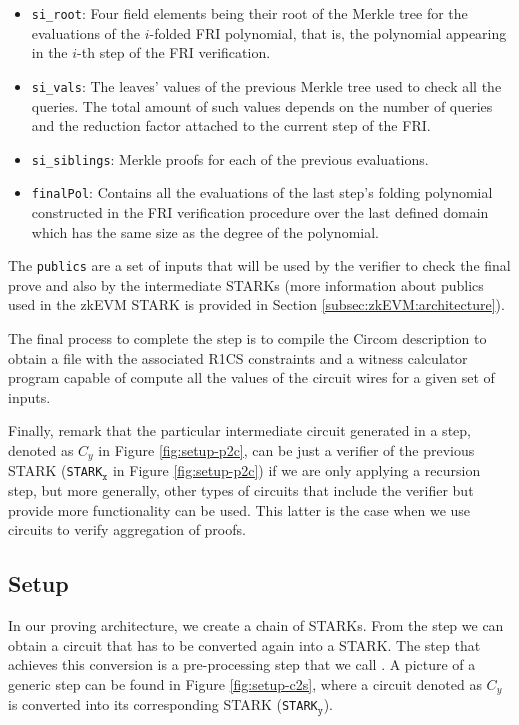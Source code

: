 \begin{itemize}
\item \texttt{si\_root}: Four field elements being their root of the Merkle tree for the evaluations of the $i$-folded FRI polynomial, that is, the polynomial appearing in the $i$-th step of the FRI verification. 

\item \texttt{si\_vals}: The leaves' values of the previous Merkle tree used to check all the queries. The total amount of such values depends on the number of queries and the reduction factor attached to the current step of the FRI. 


\item \texttt{si\_siblings}: Merkle proofs for each of the previous evaluations.

\item \texttt{finalPol}: Contains all the evaluations of the last step's folding polynomial constructed in the FRI verification procedure over the last defined domain which has the same size as the degree of the polynomial. 

\end{itemize}

The \texttt{publics} are a set of inputs that will be used by the verifier to check the final prove and also by the intermediate STARKs (more information about publics used in the zkEVM STARK is provided in Section \ref{subsec:zkEVM:architecture}).

The final process to complete the \stoc step is to compile the Circom description to obtain a file with the associated R1CS constraints and a witness calculator program capable of compute all the values of the circuit wires for a given set of inputs.

Finally, remark that the particular intermediate circuit generated in a \stoc step,  denoted as $C_y$ in Figure \ref{fig:setup-p2c}, can be just a verifier of the previous STARK (\texttt{STARK}$_\texttt{x}$ in Figure \ref{fig:setup-p2c}) if we are only applying a recursion step, but more generally, other types of circuits that include the verifier but provide more functionality can be used. 
This latter is the case when we use circuits to verify aggregation of proofs.


\subsection{Setup \ctos \label{subsec:ctos}}

In our proving architecture, we create a chain of STARKs. 
From the \stoc step we can obtain a circuit that has to be converted again 
into a STARK. 
The step that achieves this conversion is a pre-processing step 
that we call \ctos. A picture of a generic \ctos step can be found in Figure \ref{fig:setup-c2s}, where a circuit denoted as $C_y$
is converted into its corresponding STARK (\texttt{STARK}$_\texttt{y}$).

